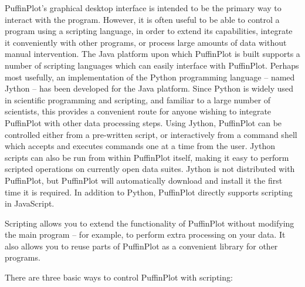 \documentclass[a4paper,british]{article}
\begin{document}
PuffinPlot's graphical desktop interface is intended to be the primary
way to interact with the program. However, it is often useful to be able
to control a program using a scripting language, in order to extend its
capabilities, integrate it conveniently with other programs, or process
large amounts of data without manual intervention. The Java platform
upon which PuffinPlot is built supports a number of scripting languages
which can easily interface with PuffinPlot. Perhaps most usefully, an
implementation of the Python programming language -- named Jython
\citep{juneau2009jython} -- has been developed for the Java platform.
Since Python is widely used in scientific programming and scripting, and
familiar to a large number of scientists, this provides a convenient
route for anyone wishing to integrate PuffinPlot with other data
processing steps. Using Jython, PuffinPlot can be controlled either from
a pre-written script, or interactively from a command shell which
accepts and executes commands one at a time from the user. Jython
scripts can also be run from within PuffinPlot itself, making it easy to
perform scripted operations on currently open data suites. Jython is not
distributed with PuffinPlot, but PuffinPlot will automatically download
and install it the first time it is required. In addition to Python,
PuffinPlot directly supports scripting in JavaScript.

Scripting allows you to extend the functionality of PuffinPlot without
modifying the main program -- for example, to perform extra processing on
your data. It also allows you to reuse parts of PuffinPlot as a convenient
library for other programs.

There are three basic ways to control PuffinPlot with scripting:
\end{document}
